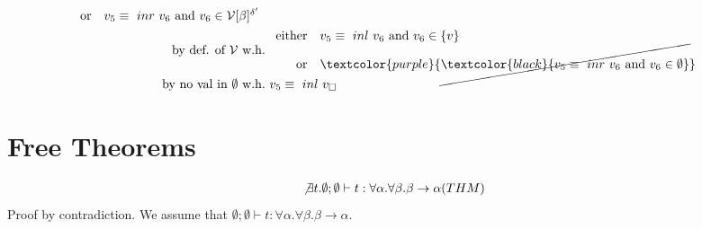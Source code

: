 \documentclass{article}
\begin{document}
\begin{align*}
\begin{array}{rl}
    \text{or} & v_5\equiv \inr v_6 \AND v_6\in\V[\beta]^{\delta'}\end{array} \\
        \text{by def. of $\V$ w.h.}  &\ \begin{array}{rl}\text{either}&v_5\equiv \inl v_6 \AND v_6\in \{v\} \\
        \text{or} & \textcolor{purple}{\cancel{\textcolor{black}{v_5\equiv \inr v_6 \AND v_6\in \emptyset}}}\end{array} \\
            \text{by no val in $\emptyset$ w.h.} &\ v_5\equiv \inl v _\square\\
        \end{align*}

\newpage
\section{Free Theorems}
\begin{gather*}
    \not\exists t. \emptyset;\emptyset\vdash t: \forall\alpha.\forall\beta.\beta\to\alpha (THM)
\end{gather*}
Proof by contradiction. We assume that $\emptyset;\emptyset\vdash t: \forall\alpha.\forall\beta.\beta\to\alpha$.
\end{document}
